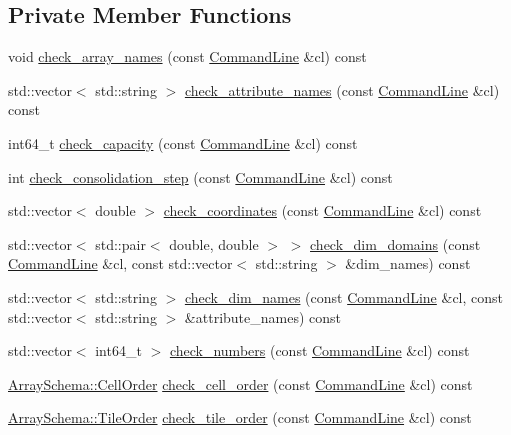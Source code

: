 \subsection*{Private Member Functions}
\begin{DoxyCompactItemize}
\item 
void \hyperlink{classParser_ae916a22b91755ab0d716adaa838a85af}{check\+\_\+array\+\_\+names} (const \hyperlink{classCommandLine}{Command\+Line} \&cl) const 
\item 
std\+::vector$<$ std\+::string $>$ \hyperlink{classParser_a5953f96579cec02c648df586f40a96e5}{check\+\_\+attribute\+\_\+names} (const \hyperlink{classCommandLine}{Command\+Line} \&cl) const 
\item 
int64\+\_\+t \hyperlink{classParser_a281db8c081c5ec50753004bbd39e8c3e}{check\+\_\+capacity} (const \hyperlink{classCommandLine}{Command\+Line} \&cl) const 
\item 
int \hyperlink{classParser_a54d26a4b2be1628448d888e699e7eb02}{check\+\_\+consolidation\+\_\+step} (const \hyperlink{classCommandLine}{Command\+Line} \&cl) const 
\item 
std\+::vector$<$ double $>$ \hyperlink{classParser_a077897c5ba04ba500ae15db025509de0}{check\+\_\+coordinates} (const \hyperlink{classCommandLine}{Command\+Line} \&cl) const 
\item 
std\+::vector$<$ std\+::pair$<$ double, double $>$ $>$ \hyperlink{classParser_a0e99de476b0ee063369e26b5a96a4d2d}{check\+\_\+dim\+\_\+domains} (const \hyperlink{classCommandLine}{Command\+Line} \&cl, const std\+::vector$<$ std\+::string $>$ \&dim\+\_\+names) const 
\item 
std\+::vector$<$ std\+::string $>$ \hyperlink{classParser_af517d50dd809e8ebca643187748d45e9}{check\+\_\+dim\+\_\+names} (const \hyperlink{classCommandLine}{Command\+Line} \&cl, const std\+::vector$<$ std\+::string $>$ \&attribute\+\_\+names) const 
\item 
std\+::vector$<$ int64\+\_\+t $>$ \hyperlink{classParser_abb750c5dfbadcde9dcdc9a49b5670eeb}{check\+\_\+numbers} (const \hyperlink{classCommandLine}{Command\+Line} \&cl) const 
\item 
\hyperlink{classArraySchema_a847601130253f905337b5e284e1b78f2}{Array\+Schema\+::\+Cell\+Order} \hyperlink{classParser_ae53a8192c27561cb9c353de058575247}{check\+\_\+cell\+\_\+order} (const \hyperlink{classCommandLine}{Command\+Line} \&cl) const 
\item 
\hyperlink{classArraySchema_ae9240847f83a545b7de651f032ffde63}{Array\+Schema\+::\+Tile\+Order} \hyperlink{classParser_a39c76e50681f4e2567e829d58aa0fdd3}{check\+\_\+tile\+\_\+order} (const \hyperlink{classCommandLine}{Command\+Line} \&cl) const 

\end{DoxyCompactItemize}
